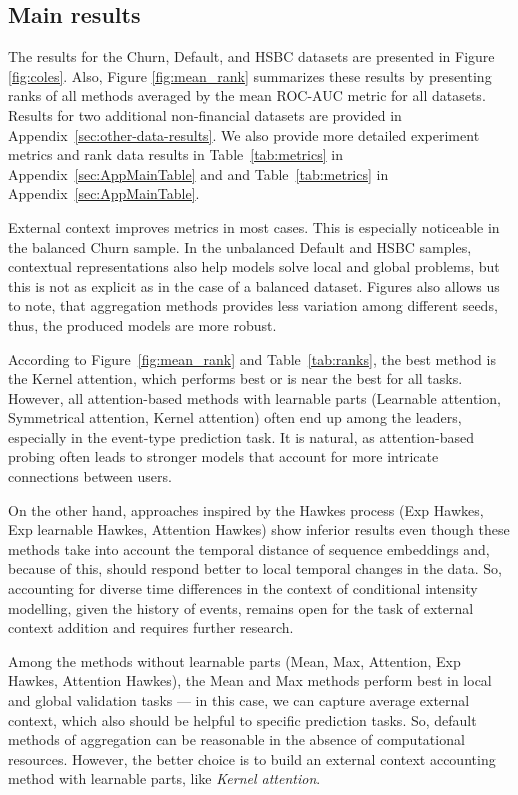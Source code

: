 \subsection{Main results}

The results for the Churn, Default, and HSBC datasets are presented in Figure \ref{fig:coles}.
Also, Figure \ref{fig:mean_rank} summarizes these results by presenting ranks of all methods averaged by the mean ROC-AUC metric for all datasets.
Results for two additional non-financial datasets are provided in Appendix~\ref{sec:other-data-results}. We also provide more detailed experiment metrics and rank data results in Table~\ref{tab:metrics} in Appendix~\ref{sec:AppMainTable} and and Table~\ref{tab:metrics} in Appendix~\ref{sec:AppMainTable}.

External context improves metrics in most cases. This is especially noticeable in the balanced Churn sample. In the unbalanced Default and HSBC samples, contextual representations also help models solve local and global problems, but this is not as explicit as in the case of a balanced dataset. Figures also allows us to note, that aggregation methods provides less variation among different seeds, thus, the produced models are more robust. 

According to Figure~\ref{fig:mean_rank} and Table~\ref{tab:ranks}, the best method is the Kernel attention, which performs best or is near the best for all tasks.
However, all attention-based methods with learnable parts (Learnable attention, Symmetrical attention, Kernel attention) often end up among the leaders, especially in the event-type prediction task. 
It is natural, as attention-based probing often leads to stronger models that account for more intricate connections between users.

On the other hand, approaches inspired by the Hawkes process (Exp Hawkes, Exp learnable Hawkes, Attention Hawkes) show inferior results even though these methods take into account the temporal distance of sequence embeddings and, because of this, should respond better to local temporal changes in the data. 
So, accounting for diverse time differences in the context of conditional intensity modelling, given the history of events, remains open for the task of external context addition and requires further research.

Among the methods without learnable parts (Mean, Max, Attention, Exp Hawkes, Attention Hawkes), the Mean and Max methods perform best in local and global validation tasks --- in this case, we can capture average external context, which also should be helpful to specific prediction tasks. 
So, default methods of aggregation can be reasonable in the absence of computational resources. 
However, the better choice is to build an external context accounting method with learnable parts, like \emph{Kernel attention}. 

